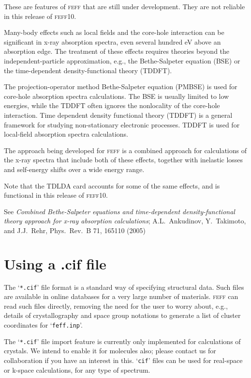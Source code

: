 \documentclass[11pt,oneside]{report} %
\renewcommand{\htmlref}[2]{\hyperlink{#2}{#1}}
\newcommand{\program}[1]{\textsc{#1}}
\newcommand{\feff}{\program{feff}}
\newcommand{\vnum}{10}
\newcommand{\feffcur}{\feff\vnum}
\newcommand{\file}[1]{`\texttt{#1}'}
\renewcommand{\htmlref}[2]{{#1}} %
\begin{document}
These are features of {\feff} that are still under development. 
They are not reliable in this release of {\feffcur}.

Many-body effects such as local fields and the core-hole interaction 
can be significant in x-ray absorption spectra, even several hundred 
eV above an absorption edge. The treatment of these effects requires 
theories beyond the independent-particle approximation, e.g., the Bethe-Salpeter
equation (BSE) or the time-dependent density-functional theory (TDDFT).

The projection-operator method Bethe-Salpeter equation (PMBSE) is used 
for core-hole absorption spectra calculations. The BSE is usually limited 
to low energies, while the TDDFT often ignores the nonlocality of the 
core-hole interaction. Time dependent density functional theory (TDDFT) 
is a general framework for studying non-stationary electronic processes. 
TDDFT is used for local-field absorption spectra calculations. 

The approach being developed for {\feff} is a combined approach for 
calculations of the x-ray spectra that include both of these effects, 
together with inelastic losses and self-energy shifts over a wide 
energy range. 

Note that the \htmlref{TDLDA}{card:tdl} card accounts for some of the same 
effects, and is functional in this release of {\feffcur}.

See \emph{Combined Bethe-Salpeter equations and time-dependent density-functional 
theory approach for x-ray absorption calculations}; A.L.\ Ankudinov, Y.\ Takimoto, 
and J.J.\ Rehr, Phys.\ Rev.\ B 71, 165110 (2005)



\section{Using a .cif file}

The \file{*.cif} file format is a standard way of specifying structural data.  Such files are available in online databases for a very large number of materials.  {\feff} can read such files directly, removing the need for the user to worry about, e.g., details of crystallography and space group notations to generate a list of cluster coordinates for \file{feff.inp}.  

The \file{*.cif} file import feature is currently only implemented for calculations of crystals.  We intend to enable it for molecules also; please contact us for collaboration if you have an interest in this.  \file{cif} files can be used for real-space or k-space calculations, for any type of spectrum.
\end{document}
